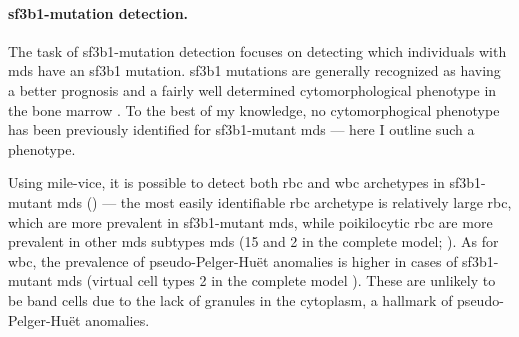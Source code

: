 \begin{figure}[!ht]
    \label{fig:wbc-disease-classification-examples}
\end{figure}

\paragraph{\ac{sf3b1}-mutation detection.} The task of \ac{sf3b1}-mutation detection focuses on detecting which individuals with \ac{mds} have an \ac{sf3b1} mutation. \Ac{sf3b1} mutations are generally recognized as having a better prognosis and a fairly well determined cytomorphological phenotype in the bone marrow \cite{Malcovati2020-no,Hellstrom_Lindberg2015-zs,Malcovati2015-tz}. To the best of my knowledge, no cytomorphogical phenotype has been previously identified for \ac{sf3b1}-mutant \ac{mds} --- here I outline such a phenotype. 

Using \ac{mile-vice}, it is possible to detect both \ac{rbc} and \ac{wbc} archetypes in \ac{sf3b1}-mutant \ac{mds} () --- the most easily identifiable \ac{rbc} archetype is relatively large \ac{rbc}, which are more prevalent in \ac{sf3b1}-mutant \ac{mds}, while poikilocytic \ac{rbc} are more prevalent in other \ac{mds} subtypes \ac{mds} (15 and 2 in the complete model; ). As for \ac{wbc}, the prevalence of pseudo-Pelger-Huët anomalies is higher in cases of \ac{sf3b1}-mutant \ac{mds} (virtual cell types 2 in the complete model ). These are unlikely to be band cells due to the lack of granules in the cytoplasm, a hallmark of pseudo-Pelger-Huët anomalies.

\begin{figure}[!ht]
    \label{fig:mile-vice-vcq-so-mds-classification}
\end{figure}

